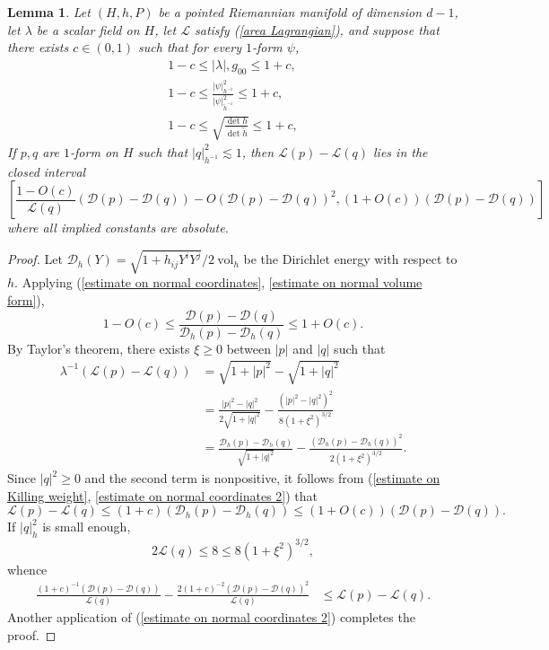 \documentclass[reqno,12pt,letterpaper]{amsart}
\newcommand{\Lagrange}{\mathscr L}
\newcommand{\DirL}{\mathscr D}
\newcommand{\vol}{\mathrm{vol}}
\newtheorem{lemma}[theorem]{Lemma}
\theoremstyle{definition}
\numberwithin{equation}{section}
\begin{document}
\begin{lemma}\label{Taylor lemma}
Let $(H, h, P)$ be a pointed Riemannian manifold of dimension $d - 1$, let $\lambda$ be a scalar field on $H$, let $\Lagrange$ satisfy (\ref{area Lagrangian}), and suppose that there exists $c \in (0, 1)$ such that for every $1$-form $\psi$,
\begin{align}
1 - c \leq |\lambda|, g_{00} \leq 1 + c, \label{estimate on Killing weight} \\
1 - c \leq \frac{|\psi|^2_{h^{-1}}}{|\psi|^2_{\tilde h^{-1}}} \leq 1 + c, \label{estimate on normal coordinates}\\
1 - c \leq \sqrt{\frac{\det h}{\det \tilde h}} \leq 1 + c, \label{estimate on normal volume form}
\end{align}
If $p,q$ are $1$-form on $H$ such that $|q|^2_{h^{-1}} \lesssim 1$, then $\Lagrange(p) - \Lagrange(q)$ lies in the closed interval
$$\left[\frac{1 - O(c)}{\Lagrange(q)}(\DirL(p) - \DirL(q)) - O(\DirL(p) - \DirL(q))^2, (1 + O(c))(\DirL(p) - \DirL(q))\right]$$
where all implied constants are absolute.
\end{lemma}
\begin{proof}
Let $\DirL_h(Y) = \sqrt{1 + h_{ij} Y^i Y^j}/2 ~\vol_h$ be the Dirichlet energy with respect to $h$.
Applying (\ref{estimate on normal coordinates}, \ref{estimate on normal volume form}),
\begin{equation}\label{estimate on normal coordinates 2}
1 - O(c) \leq \frac{\DirL(p) - \DirL(q)}{\DirL_h(p) - \DirL_h(q)} \leq 1 + O(c).
\end{equation}
By Taylor's theorem, there exists $\xi \geq 0$ between $|p|$ and $|q|$ such that
\begin{align*}
\lambda^{-1}(\Lagrange(p) - \Lagrange(q)) &= \sqrt{1 + |p|^2} - \sqrt{1 + |q|^2}\\
&= \frac{|p|^2 - |q|^2}{2 \sqrt{1 + |q|^2}} - \frac{(|p|^2 - |q|^2)^2}{8(1 + \xi^2)^{3/2}} \\
&= \frac{\DirL_h(p) - \DirL_h(q)}{\sqrt{1 + |q|^2}} - \frac{(\DirL_h(p) - \DirL_h(q))^2}{2(1 + \xi^2)^{3/2}}.
\end{align*}
Since $|q|^2 \geq 0$ and the second term is nonpositive, it follows from (\ref{estimate on Killing weight}, \ref{estimate on normal coordinates 2}) that
$$\Lagrange(p) - \Lagrange(q) \leq (1 + c)(\DirL_h(p) - \DirL_h(q)) \leq (1 + O(c))(\DirL(p) - \DirL(q)).$$
If $|q|^2_h$ is small enough,
$$2\Lagrange(q) \leq 8 \leq 8(1 + \xi^2)^{3/2},$$
whence
\begin{align*}
\frac{(1 + c)^{-1}(\DirL(p) - \DirL(q))}{\Lagrange(q)} - \frac{2(1 + c)^{-2}(\DirL(p) - \DirL(q))^2}{\Lagrange(q)} &\leq \Lagrange(p) - \Lagrange(q).
\end{align*}
Another application of (\ref{estimate on normal coordinates 2}) completes the proof.
\end{proof}
\end{document}
